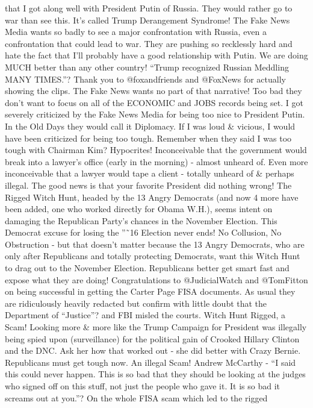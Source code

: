 that I got along well with President Putin of Russia. They would rather
go to war than see this. It's called Trump Derangement Syndrome! The
Fake News Media wants so badly to see a major confrontation with Russia,
even a confrontation that could lead to war. They are pushing so
recklessly hard and hate the fact that I'll probably have a good
relationship with Putin. We are doing MUCH better than any other
country! ``Trump recognized Russian Meddling MANY TIMES.''? Thank you to
@foxandfriends and @FoxNews for actually showing the clips. The Fake
News wants no part of that narrative! Too bad they don't want to focus
on all of the ECONOMIC and JOBS records being set. I got severely
criticized by the Fake News Media for being too nice to President Putin.
In the Old Days they would call it Diplomacy. If I was loud \& vicious,
I would have been criticized for being too tough. Remember when they
said I was too tough with Chairman Kim? Hypocrites! Inconceivable that
the government would break into a lawyer's office (early in the morning)
- almost unheard of. Even more inconceivable that a lawyer would tape a
client - totally unheard of \& perhaps illegal. The good news is that
your favorite President did nothing wrong! The Rigged Witch Hunt, headed
by the 13 Angry Democrats (and now 4 more have been added, one who
worked directly for Obama W.H.), seems intent on damaging the Republican
Party's chances in the November Election. This Democrat excuse for
losing the ''˜16 Election never ends! No Collusion, No Obstruction - but
that doesn't matter because the 13 Angry Democrats, who are only after
Republicans and totally protecting Democrats, want this Witch Hunt to
drag out to the November Election. Republicans better get smart fast and
expose what they are doing! Congratulations to @JudicialWatch and
@TomFitton on being successful in getting the Carter Page FISA
documents. As usual they are ridiculously heavily redacted but confirm
with little doubt that the Department of ``Justice''? and FBI misled the
courts. Witch Hunt Rigged, a Scam! Looking more \& more like the Trump
Campaign for President was illegally being spied upon (surveillance) for
the political gain of Crooked Hillary Clinton and the DNC. Ask her how
that worked out - she did better with Crazy Bernie. Republicans must get
tough now. An illegal Scam! Andrew McCarthy - ``I said this could never
happen. This is so bad that they should be looking at the judges who
signed off on this stuff, not just the people who gave it. It is so bad
it screams out at you.''? On the whole FISA scam which led to the rigged
